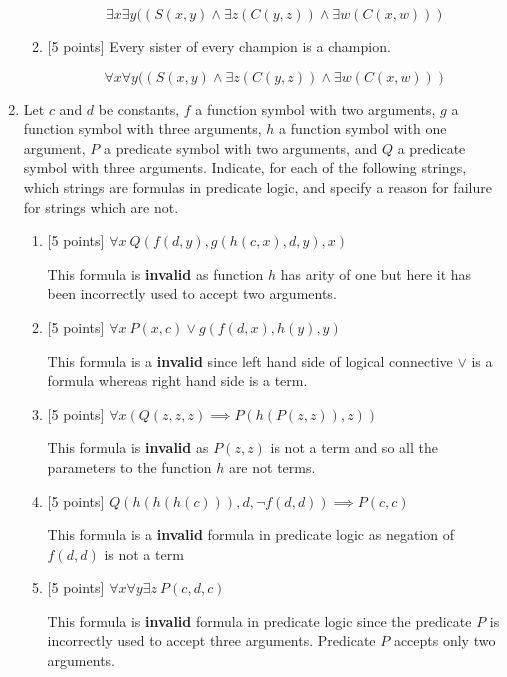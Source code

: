 \documentclass{article}
\begin{document}
\begin{enumerate}
\begin{enumerate}
  \begin{answer}
     \begin{displaymath}
   \exists x \exists y((S(x,y)\land \exists z(C(y,z)) \land \exists w(C(x,w)))
        \end{displaymath}
\end{answer} 
\item {[5 points]} Every sister of every champion is a champion.
\begin{answer}
 \begin{displaymath}
 \forall x \forall y((S(x,y)\land \exists z(C(y,z)) \land \exists w(C(x,w)))
         \end{displaymath}
\end{answer}
\end{enumerate}

\item Let $c$ and $d$ be constants, $f$ a function symbol with two
  arguments, $g$ a function symbol with three arguments, $h$ a
  function symbol with one argument, $P$ a predicate symbol with two
  arguments, and $Q$ a predicate symbol with three arguments.
  Indicate, for each of the following strings, which strings are
  formulas in predicate logic, and specify a reason for failure for
  strings which are not.
  \begin{enumerate}
  \item {[5 points]} $\forall x\ Q(f(d,y),g(h(c,x),d,y),x)$
  \begin{answer}
  This formula is \textbf{invalid} as function $h$ has arity of one but here it has been incorrectly used to accept two arguments.
  \end{answer}
  \item {[5 points]} $\forall x\ P(x,c) \lor g(f(d,x),h(y),y)$
   \begin{answer}
  This formula is a \textbf{invalid} since left hand side of logical connective $\lor$ is a formula whereas right hand side is a term.
    \end{answer}
  \item {[5 points]} $\forall x (Q(z,z,z) \implies P(h(P(z,z)),z))$
  \begin{answer}
  This formula is \textbf{invalid} as $P(z,z)$ is not a term and so all the parameters to the function $h$ are not terms.
  \end{answer}
  \item {[5 points]} $Q(h(h(h(c))),d,\neg f(d,d)) \implies P(c,c)$
    \begin{answer}
  This formula is a \textbf{invalid} formula in predicate logic as negation of $f(d,d)$ is not a term
   \end{answer}
  \item {[5 points]} $\forall x \forall y \exists z\ P(c,d,c)$
      \begin{answer}
  This formula is \textbf{invalid} formula in predicate logic since the
  	predicate $P$ is incorrectly used to accept three arguments. Predicate $P$ accepts only two arguments.
   \end{answer}
  \end{enumerate}


\end{enumerate}
\end{document}
